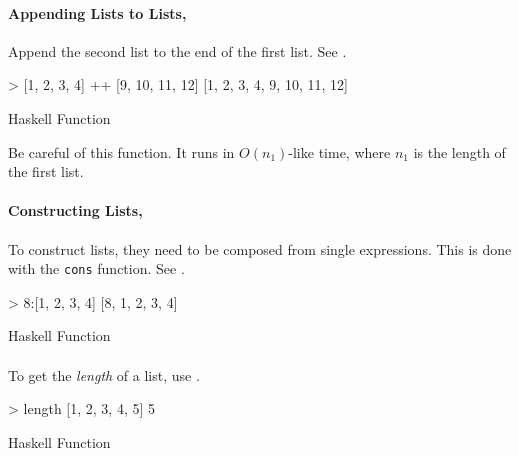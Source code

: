 \paragraph{\texorpdfstring{Appending Lists to Lists, \haskellinline{++}}{Appending Lists to Lists}}\label{par:List_Append_Function}
Append the second list to the end of the first list.
See .
\begin{listing}[h!tbp]
\begin{haskellsource}
  > [1, 2, 3, 4] ++ [9, 10, 11, 12]
  [1, 2, 3, 4, 9, 10, 11, 12]
\end{haskellsource}
\caption{Haskell \haskellinline{++} Function}
\label{lst:List_Append_Function}
\end{listing}

\begin{remark*}
  Be careful of this function.
  It runs in $O(n_{1})$-like time, where $n_{1}$ is the length of the first list.
\end{remark*}

\paragraph{\texorpdfstring{Constructing Lists, \haskellinline{:}}{\texttt{cons}tructing Lists}}\label{par:List_Cons_Function}
To construct lists, they need to be composed from single expressions.
This is done with the \texttt{cons} function.
See .
\begin{listing}[h!tbp]
\begin{haskellsource}
  > 8:[1, 2, 3, 4]
  [8, 1, 2, 3, 4]
\end{haskellsource}
\caption{Haskell \haskellinline{:} Function}
\label{lst:List_Cons_Function}
\end{listing}

\paragraph{\texorpdfstring{}{\texttt{length}}}\label{par:List_Length_Function}
To get the \emph{length} of a list, use .
\begin{listing}[h!tbp]
\begin{haskellsource}
  > length [1, 2, 3, 4, 5]
  5
\end{haskellsource}
\caption{Haskell  Function}
\label{lst:List_Length_Function}
\end{listing}

